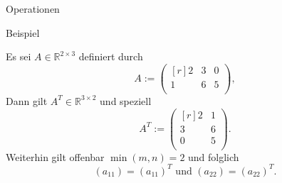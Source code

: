 \documentclass[
  8pt,
  ignorenonframetext,
]{beamer}
\begin{document}
\begin{frame}{Operationen}
\protect\hypertarget{operationen-11}{}
\small

Beispiel

Es sei \(A \in \mathbb{R}^{2 \times 3}\) definiert durch
\begin{equation}
A:=\begin{pmatrix*}[r]
2 & 3 & 0 \\
1 & 6 & 5 \\
\end{pmatrix*},
\end{equation} Dann gilt \(A^T \in \mathbb{R}^{3 \times 2}\) und
speziell \begin{equation}
A^{T} :=
\begin{pmatrix*}[r]
2  & 1 \\
3  & 6 \\
0  & 5 \\
\end{pmatrix*}.
\end{equation} Weiterhin gilt offenbar \(\min(m,n) = 2\) und folglich
\begin{equation}
(a_{11}) = \left(a_{11}\right)^T
\mbox{ und }
(a_{22}) = \left(a_{22}\right)^T.
\end{equation}
\end{frame}
\end{document}
